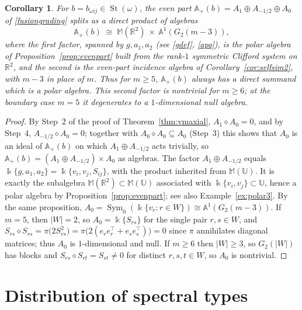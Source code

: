 \documentclass[times,11pt,reqno]{amsproc}
\newtheorem{corollary}[theorem]{Corollary}
\theoremstyle{definition}
\numberwithin{equation}{section}
\newcommand\fie{\Bbbk}
\def\alg{\mathbb{A}}
\def\ualg{\mathbb{U}}
\DeclareMathOperator{\St}{St}
\DeclareMathOperator{\Sym}{Sym}
\def\ualg{\mathbb{U}}
\def\malg{\mathbb{M}}
\newcommand{\vm}[1]{\malg(#1)}
\begin{document}
\begin{corollary}\label{cor:evenpartclifford}
For $b=b_{\omega ij}\in\St(\omega)$, the even part
$\alg_+(b)=A_1\oplus A_{-1/2}\oplus A_0$ of \eqref{fusiongrading} splits
as a direct product of algebras
$$
\alg_+(b)\;\cong\;\vm{\mathbb R^2}\ \times\ \alg^1(G_2(m-3)),
$$
where the first factor, spanned by $g,a_1,a_2$ (see \eqref{gdef}, \eqref{apq}), is the  polar
algebra of Proposition~\ref{prop:evenpart} built from the rank-$1$
symmetric Clifford system on $\mathbb R^2$, and the second is the
even-part incidence algebra of Corollary~\ref{cor:selfsim2}, with $m-3$ in place of $m$. Thus for $m\ge5$, $\alg_+(b)$ always has a direct summand which is a polar algebra.
This second factor is nontrivial for $m\ge6$; at the boundary
case $m=5$ it degenerates to a $1$-dimensional null algebra.
\end{corollary}


\begin{proof}
By Step~2 of the proof of Theorem~\ref{thm:vmaxial}, $A_1\diamond A_0=0$,
and by Step~4, $A_{-1/2}\diamond A_0=0$; together with
$A_0\diamond A_0\subseteq A_0$ (Step~3) this shows that $A_0$ is an ideal
of $\alg_+(b)$ on which $A_1\oplus A_{-1/2}$ acts trivially, so
$\alg_+(b)=(A_1\oplus A_{-1/2})\times A_0$ as algebras. The factor
$A_1\oplus A_{-1/2}$ equals $\fie\{g,a_1,a_2\}=\fie\{v_i,v_j,S_{ij}\}$, with the
product inherited from $\vm{\ualg}$. It is exactly the subalgebra
$\vm{\mathbb R^2}\subset\vm{\ualg}$ associated with
$\fie\{v_i,v_j\}\subset\ualg$, hence a  polar algebra by
Proposition~\ref{prop:evenpart}; see also Example~\ref{ex:polar3}. By the same proposition,
$A_0=\Sym_0(\fie\{v_r:r\in W\})\cong\alg^1(G_2(m-3))$. If $m=5$, then
$|W|=2$, so $A_0=\fie\{S_{rs}\}$ for the single pair $r,s\in W$, and
$S_{rs}\diamond S_{rs}=\pi\bigl(2S_{rs}^2\bigr)=\pi\bigl(2(e_re_r^\top+e_se_s^\top)\bigr)=0$
since $\pi$ annihilates diagonal matrices; thus $A_0$ is $1$-dimensional
and null. If $m\ge6$ then $|W|\ge3$, so $G_2(|W|)$ has blocks and
$S_{rs}\diamond S_{rt}=S_{st}\neq0$ for distinct $r,s,t\in W$, so $A_0$
is nontrivial.
\end{proof}


\section{Distribution of spectral types}\label{sec:dist}
\end{document}
